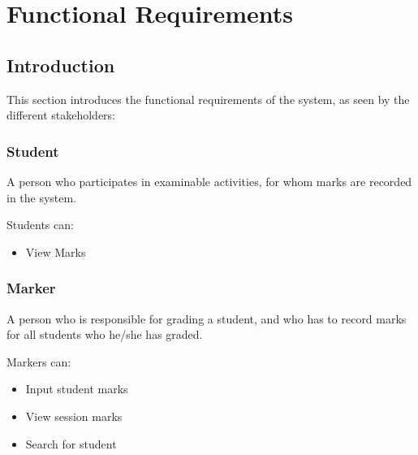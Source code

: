\documentclass[a4paper]{article}
\begin{document}
	\section{Functional Requirements}

		\subsection{Introduction}

			This section introduces the functional requirements of the system, as seen by the different stakeholders:

			\subsubsection{Student}
				\begin{flushleft}
				A person who participates in examinable activities, for whom marks are recorded in the system. \linebreak 
				
				Students can:
				\end{flushleft}
				\begin{itemize}

					\item{View Marks}

				\end{itemize}

			\subsubsection{Marker}
				\begin{flushleft}
				A person who is responsible for grading a student, and who has to record marks for all students who he/she has graded. \linebreak 
				
				Markers can:
				\end{flushleft}
				\begin{itemize}

					\item{Input student marks}
					
					\item{View session marks}
					
					\item{Search for student}

				\end{itemize}
				
\end{document}
